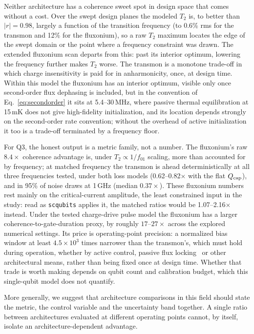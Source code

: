 \documentclass{SciPost}
\begin{document}
Neither architecture has a coherence sweet spot in design space that comes without a cost. Over the swept design
planes the modeled $T_2$ is, to better than $|r| = 0.98$, largely a function of the transition
frequency (to 0.6\% rms for the transmon and 12\% for the fluxonium), so a raw $T_2$ maximum
locates the edge of the swept domain or the point where a frequency constraint was drawn. The
extended fluxonium scan departs from this: past its interior optimum, lowering the frequency
further makes $T_2$ worse.
The transmon is a monotone trade-off in which charge insensitivity is paid for in
anharmonicity, once, at design time. Within this model the fluxonium has an interior optimum, visible only once second-order flux dephasing is included, but in the convention of Eq.~\eqref{eq:secondorder} it sits at 5.4--30\,MHz, where passive thermal equilibration at 15\,mK does not give high-fidelity initialization, and its location
depends strongly on the second-order rate convention; without the overhead of active initialization it too is a
trade-off terminated by a frequency floor.

For Q3, the honest output is a metric family, not a number. The fluxonium's raw $8.4\times$ coherence advantage is, under $T_2\propto 1/f_{01}$ scaling, more than
accounted for by frequency; at matched frequency the transmon is ahead deterministically at all three frequencies tested, under
both loss models (0.62--0.82$\times$ with the flat $Q_{\rm cap}$), and in 95\% of noise draws at 1\,GHz
(median $0.37\times$). These fluxonium numbers rest mainly on the critical-current amplitude, the least
constrained input in the study: read as \texttt{scqubits} applies it, the matched ratios would be
1.07--2.16$\times$ instead.
Under the tested charge-drive pulse model the fluxonium has a larger coherence-to-gate-duration
proxy, by roughly $17$--$27\times$ across the explored numerical settings. Its price is
operating-point precision: a normalized bias window at least $4.5\times10^3$ times narrower than the
transmon's, which must hold during operation, whether by active control, passive flux
locking~\cite{benatre2025} or other architectural means, rather than being fixed once at design
time. Whether that trade is worth making depends on qubit
count and calibration budget, which this single-qubit model does not quantify.

More generally, we suggest that architecture comparisons in this field should state the
metric, the control variable and the uncertainty band together. A single ratio between architectures evaluated at different operating points cannot, by itself,
isolate an architecture-dependent advantage.
\end{document}
